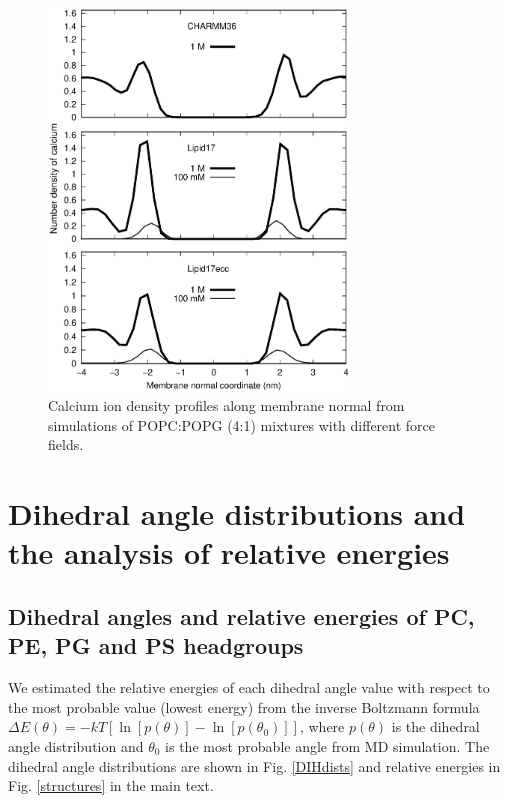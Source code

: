 \documentclass[journal=jpcbfk]{achemso}
\begin{document}
\begin{figure}[]
  \centering
  \includegraphics[width=8.0cm]{./Figs/CAdensPG1PC4.eps}
  \caption{\label{CAdensPG1PC4}
    Calcium ion density profiles along membrane normal from simulations of POPC:POPG (4:1) mixtures with different force fields.
  }
\end{figure}

\clearpage
\section{Dihedral angle distributions and the analysis of relative energies}
  

\subsection{Dihedral angles and relative energies of PC, PE, PG and PS headgroups}

We estimated the relative energies of each dihedral angle value
with respect to the most probable value (lowest energy) 
from the inverse Boltzmann formula $\Delta E(\theta) = -kT \left[\ln\left[p(\theta)\right]-\ln\left[p(\theta_0)\right] \right]$,
where $p(\theta)$ is the dihedral angle distribution and $\theta_0$ is the most probable angle from MD simulation.
The dihedral angle distributions are shown in Fig. \ref{DIHdists}
and relative energies in Fig. \ref{structures} in the main text.
\end{document}
